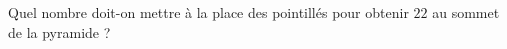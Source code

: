 
\begin{exercice}\label{exo2smath-0281}

    Quel nombre doit-on mettre à la place des pointillés pour obtenir \( 22\) au sommet de la pyramide ?

    \begin{multicols}{2}
        

        
    \end{multicols}

\end{exercice}
